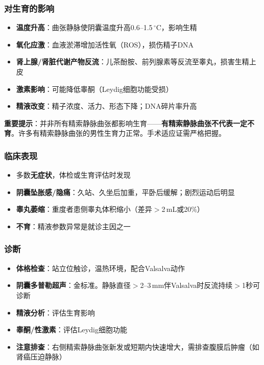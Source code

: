 \subsubsection{对生育的影响}

\begin{itemize}[leftmargin=2cm]
	\item \textbf{温度升高}：曲张静脉使阴囊温度升高0.6--1.5\,$^\circ$C，影响生精
	\item \textbf{氧化应激}：血液淤滞增加活性氧（ROS），损伤精子DNA
	\item \textbf{肾上腺/肾脏代谢产物反流}：儿茶酚胺、前列腺素等反流至睾丸，损害生精上皮
	\item \textbf{激素影响}：可能降低睾酮（Leydig细胞功能受损）
	\item \textbf{精液改变}：精子浓度、活力、形态下降；DNA碎片率升高
\end{itemize}

\textbf{重要提示}：并非所有精索静脉曲张都影响生育——\textbf{有精索静脉曲张不代表一定不育}。许多有精索静脉曲张的男性生育力正常。手术适应证需严格把握。

\subsubsection{临床表现}

\begin{itemize}[leftmargin=2cm]
	\item 多数\textbf{无症状}，体检或生育评估时发现
	\item \textbf{阴囊坠胀感/隐痛}：久站、久坐后加重，平卧后缓解；剧烈运动后明显
	\item \textbf{睾丸萎缩}：重度者患侧睾丸体积缩小（差异$>$2\,mL或20\%）
	\item \textbf{不育}：精液参数异常是就诊主因之一
\end{itemize}

\subsubsection{诊断}

\begin{itemize}[leftmargin=2cm]
	\item \textbf{体格检查}：站立位触诊，温热环境，配合Valsalva动作
	\item \textbf{阴囊多普勒超声}：金标准。静脉直径$>$2--3\,mm伴Valsalva时反流持续$>$1秒可诊断
	\item \textbf{精液分析}：评估生育影响
	\item \textbf{睾酮/性激素}：评估Leydig细胞功能
	\item \textbf{注意排查}：右侧精索静脉曲张新发或短期内快速增大，需排查腹膜后肿瘤（如肾癌压迫静脉）
\end{itemize}

